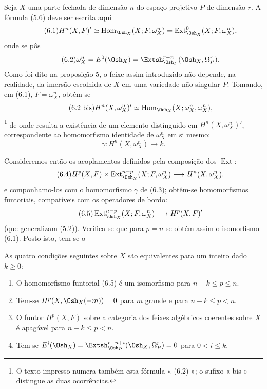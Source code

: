 
Seja $X$ uma parte fechada de dimensão $n$ do espaço projetivo $P$ de
dimensão $r$. A fórmula (5.6) deve ser escrita aqui
\begin{equation}\tag{6.1}
  H^{n}(X,F)'
  \simeq\operatorname{Hom}_{\Osh_X}(X;F,\omega_X^{n})
  =\operatorname{Ext}_{\Osh_X}^{0}(X;F,\omega_X^{n}),
\end{equation}
onde se pôs
\begin{equation}\tag{6.2}
  \omega_X^{n}=E^{0}(\Osh_X)
  =\Extsh_{\Osh_P}^{r-n}(\Osh_X,\Omega_P^{r}).
\end{equation}
Como foi dito na proposição 5, o feixe assim introduzido não depende,
na realidade, da imersão escolhida de $X$ em uma variedade não singular $P$.
Tomando, em (6.1), $F=\omega_X^{n}$, obtém-se
\begin{equation}\tag{6.2 bis}
  H^{n}(X,\omega_X^{n})'
  \simeq\operatorname{Hom}_{\Osh_X}(X;\omega_X^{n},\omega_X^{n}),
\end{equation}
\footnote{O texto impresso numera também esta fórmula « (6.2) »; o sufixo
« bis » distingue as duas ocorrências.} de onde resulta a existência de um elemento
distinguido em $H^{n}(X,\omega_X^{n})'$, correspondente ao homomorfismo
identidade de $\omega_X^{n}$ em si mesmo:
\begin{equation}\tag{6.3}
  \gamma:H^{n}(X,\omega_X^{n})\longrightarrow k.
\end{equation}

Consideremos então os acoplamentos definidos pela composição dos $\operatorname{Ext}$:
\begin{equation}\tag{6.4}
  H^{p}(X,F)\times
  \operatorname{Ext}_{\Osh_X}^{n-p}(X;F,\omega_X^{n})
  \longrightarrow H^{n}(X,\omega_X^{n}),
\end{equation}
e componhamo-los com o homomorfismo $\gamma$ de (6.3); obtêm-se
homomorfismos funtoriais, compatíveis com os operadores de bordo:
\begin{equation}\tag{6.5}
  \operatorname{Ext}_{\Osh_X}^{n-p}(X;F,\omega_X^{n})
  \longrightarrow H^{p}(X,F)'
\end{equation}
(que generalizam (5.2)). Verifica-se que para $p=n$ se obtém assim
o isomorfismo (6.1). Posto isto, tem-se o

 As quatro condições seguintes sobre $X$ são
equivalentes para um inteiro dado $k\geq0$:
\begin{enumerate}
  \item[\textit{i.}] O homomorfismo funtorial (6.5) é um isomorfismo para
    $n-k\leq p\leq n$.
  \item[\textit{ii.}] Tem-se $H^{p}(X,\Osh_X(-m))=0$ para $m$ grande e para
    $n-k\leq p<n$.
  \item[\textit{iii.}] O funtor $H^{p}(X,F)$ sobre a categoria dos feixes
    algébricos coerentes sobre $X$ é apagável para $n-k\leq p<n$.
  \item[\textit{iv.}] Tem-se
    $E^{i}(\Osh_X)=\Extsh_{\Osh_P}^{r-n+i}(\Osh_X,\Omega_P^{r})=0$
    para $0<i\leq k$.
\end{enumerate}

